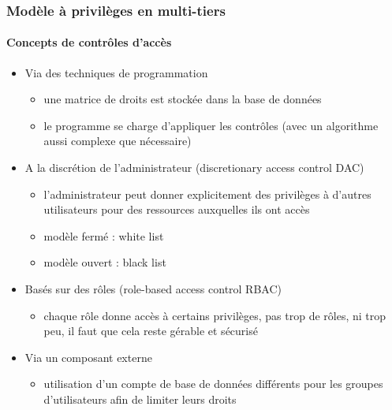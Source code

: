 \documentclass{beamer}
\begin{document}
\begin{frame}
  \frametitle{Modèle à privilèges en multi-tiers}
  \framesubtitle{Concepts de contrôles d'accès}
  \begin{itemize}
    \item Via des techniques de programmation
    \begin{itemize}
      \item une matrice de droits est stockée dans la base de données 
      \item le programme se charge d'appliquer les contrôles (avec un algorithme aussi complexe que nécessaire)
    \end{itemize}
    \item A la discrétion de l'administrateur (discretionary access control DAC)
    \begin{itemize}
      \item l'administrateur peut donner explicitement des privilèges à d'autres utilisateurs pour des ressources auxquelles ils ont accès
      \item modèle fermé : white list
      \item modèle ouvert : black list
    \end{itemize}
    \item Basés sur des rôles (role-based access control RBAC)
    \begin{itemize}
      \item chaque rôle donne accès à certains privilèges, pas trop de rôles, ni trop peu, il faut que cela reste gérable et sécurisé
    \end{itemize}
    \item Via un composant externe
    \begin{itemize}
      \item utilisation d'un compte de base de données différents pour les groupes d'utilisateurs afin de limiter leurs droits
    \end{itemize}
  \end{itemize}
\end{frame}
\end{document}
